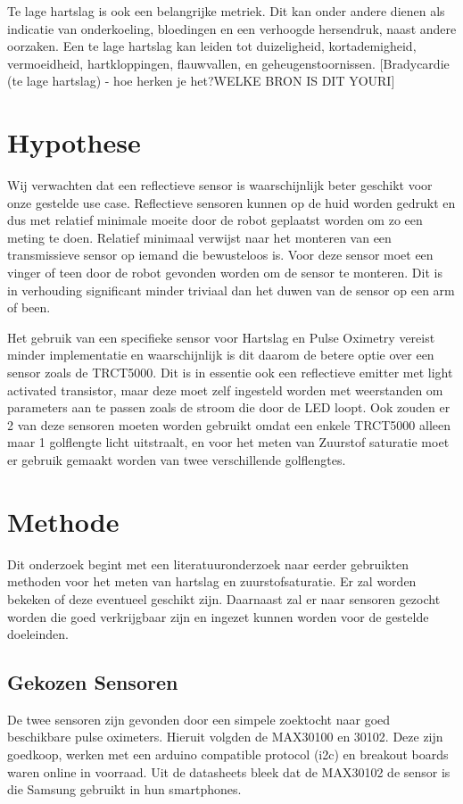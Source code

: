 \documentclass[11pt]{article}
\begin{document}
    Te lage hartslag is ook een belangrijke metriek. 
    Dit kan onder andere dienen als indicatie van onderkoeling, bloedingen en een verhoogde hersendruk, naast andere oorzaken. 
    Een te lage hartslag kan leiden tot duizeligheid, kortademigheid, vermoeidheid, hartkloppingen, flauwvallen, en geheugenstoornissen. 
    [Bradycardie (te lage hartslag) - hoe herken je het?WELKE BRON IS DIT YOURI]

	\section{Hypothese}\label{sec:hypothese}

Wij verwachten dat een reflectieve sensor is waarschijnlijk beter geschikt voor onze gestelde use case. Reflectieve sensoren kunnen op de huid worden gedrukt en dus met relatief minimale moeite door de robot geplaatst worden om zo een meting te doen. Relatief minimaal verwijst naar het monteren van een transmissieve sensor op iemand die bewusteloos is. Voor deze sensor moet een vinger of teen door de robot gevonden worden om de sensor te monteren. Dit is in verhouding significant minder triviaal dan het duwen van de sensor op een arm of been. 

Het gebruik van een specifieke sensor voor Hartslag en Pulse Oximetry vereist minder implementatie en waarschijnlijk is dit daarom de betere optie over een sensor zoals de TRCT5000. Dit is in essentie ook een reflectieve emitter met light activated transistor, maar deze moet zelf ingesteld worden met weerstanden om parameters aan te passen zoals de stroom die door de LED loopt. Ook zouden er 2 van deze sensoren moeten worden gebruikt omdat een enkele TRCT5000 alleen maar 1 golflengte licht uitstraalt, en voor het meten van Zuurstof saturatie moet er gebruik gemaakt worden van twee verschillende golflengtes.



\section{Methode}\label{sec:methode}
Dit onderzoek begint met een literatuuronderzoek naar eerder gebruikten methoden voor het meten van hartslag en zuurstofsaturatie. Er zal worden bekeken of deze eventueel geschikt zijn. Daarnaast zal er naar sensoren gezocht worden die goed verkrijgbaar zijn en ingezet kunnen worden voor de gestelde doeleinden.

\subsection{Gekozen Sensoren}
De twee sensoren zijn gevonden door een simpele zoektocht naar goed beschikbare pulse oximeters. Hieruit volgden de MAX30100 en 30102. Deze zijn goedkoop, werken met een arduino compatible protocol (i2c) en breakout boards waren online in voorraad.
Uit de datasheets bleek dat de MAX30102 de sensor is die Samsung gebruikt in hun smartphones.
\end{document}
